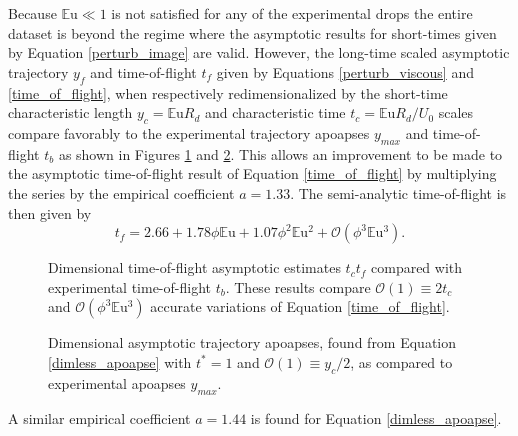 \documentclass[aip,reprint, floatfix]{revtex4-1}
\begin{document}
Because $\mathbb{E}\mbox{u} \ll 1$ is not satisfied for any of the experimental drops the entire dataset is beyond the regime where the asymptotic results for short-times given by Equation \ref{perturb_image} are valid. However, the long-time scaled asymptotic trajectory   $y_f$ and time-of-flight $t_f$ given by Equations \ref{perturb_viscous} and \ref{time_of_flight}, when respectively redimensionalized by the short-time characteristic length $y_c=\mathbb{E}\mbox{u} R_d$ and characteristic time $t_c=\mathbb{E}\mbox{u} R_d / U_0$ scales compare favorably to the experimental trajectory apoapses $y_{max}$ and time-of-flight $t_b$ as shown in Figures \ref{fig:times2} and \ref{fig:ymaxes}. This allows an improvement to be made to the asymptotic time-of-flight result of Equation \ref{time_of_flight} by multiplying the series by the empirical coefficient $a = 1.33$. The semi-analytic time-of-flight is then given by
\begin{equation}
\label{time_improved}
t_f = 2.66 + 1.78\phi\mathbb{E}\mbox{u} + 1.07\phi^2\mathbb{E}\mbox{u}^{2} + \mathcal{O}(\phi^3\mathbb{E}\mbox{u}^{3}).
\end{equation}
\begin{figure}[htb]
    \centering
    \resizebox{0.5\textwidth}{!}{}
    \caption{Dimensional time-of-flight asymptotic estimates $t_c t_f$ compared with experimental time-of-flight $t_b$. These results compare $\mathcal{O}(1) \equiv 2 t_c$ and $\mathcal{O}(\phi^3\mathbb{E}\mbox{u}^{3})$ accurate variations of Equation \ref{time_of_flight}. \label{fig:times2}}
\end{figure}
\begin{figure}[htb]
    \centering
    \resizebox{0.5\textwidth}{!}{}
    \caption{Dimensional asymptotic trajectory apoapses, found from Equation \ref{dimless_apoapse} with $t^*=1$ and $\mathcal{O}(1) \equiv y_c/2$, as compared to experimental apoapses $y_{max}$. \label{fig:ymaxes}}
\end{figure}
A similar empirical coefficient $a = 1.44$ is found for Equation \ref{dimless_apoapse}.
\end{document}
